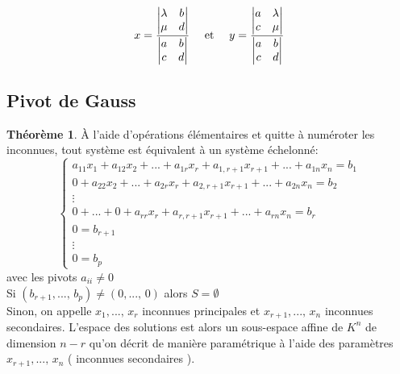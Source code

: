 \documentclass[10pt,a4paper]{article}
\theoremstyle{definition}
\newtheorem{theorem}[proposition]{Théorème}
\begin{document}
\[ x = \frac{\begin{vmatrix}
\lambda & b \\
\mu & d
\end{vmatrix}}{\begin{vmatrix}
a & b \\
c & d
\end{vmatrix}} \text{ \quad et \quad } y = \frac{\begin{vmatrix}
a & \lambda \\
c & \mu
\end{vmatrix}}{\begin{vmatrix}
a & b \\
c & d
\end{vmatrix}} \]

\subsection{Pivot de Gauss}
\begin{theorem}
À l'aide d'opérations élémentaires et quitte à numéroter les inconnues, tout système est équivalent à un système échelonné:
\[ \begin{cases}
a_{11} x_1 + a_{12} x_2 + ... + a_{1r} x_r + a_{1, r + 1} x_{r + 1} + ... + a_{1n} x_n = b_1 \\    
0 + a_{22} x_2 + ... + a_{2r} x_r + a_{2, r + 1} x_{r + 1} + ... + a_{2n} x_n = b_2 \\
\vdots \\
0 + ... + 0 + a_{rr} x_r + a_{r, r + 1} x_{r + 1} + ... + a_{rn} x_n = b_r \\
0 = b_{r + 1} \\
\vdots \\
0 = b_p      
\end{cases} \]
avec les pivots $a_{ii} \neq 0$ \\
Si $(b_{r + 1}, ...,\, b_p) \neq (0, ...,\, 0)$ alors $S = \emptyset$ \\
Sinon, on appelle $x_1, ...,\, x_r$ inconnues principales et $x_{r + 1}, ...,\, x_n$ inconnues secondaires. L'espace des solutions est alors un sous-espace affine de $K^n$ de dimension $n - r$ qu'on décrit de manière paramétrique à l'aide des paramètres $x_{r + 1}, ...,\, x_n$ ( inconnues secondaires ).
\end{theorem}
\end{document}
